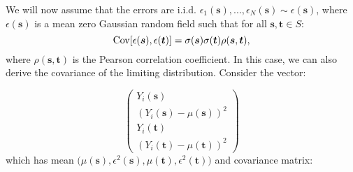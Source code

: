 We will now assume that the errors are i.i.d. $\epsilon_{1}(\bm{s}), ..., \epsilon_{N}(\bm{s}) \sim \epsilon(\bm{s})$, where $\epsilon(\bm{s})$ is a mean zero Gaussian random field such that for all $\bm{s}, \bm{t} \in S$:
\begin{equation}
\label{eq:covariance_of_errors}
\operatorname{\mathrm{Cov}}[\epsilon(\bm{s}),\epsilon(\bm{t})] = \sigma(\bm{s})\sigma(\bm{t})\rho(\bm{s},\bm{t}),
\end{equation}
where $\rho(\bm{s},\bm{t})$ is the Pearson correlation coefficient. In this case, we can also derive the covariance of the limiting distribution. Consider the vector:

\begin{equation}
\label{eq:16}
\begin{pmatrix}
	Y_i(\bm{s}) \\
    (Y_i(\bm{s}) - \mu(\bm{s}))^{2} \\
    Y_i(\bm{t}) \\
    (Y_i(\bm{t}) - \mu(\bm{t}))^{2} 
\end{pmatrix}
\end{equation}
which has mean $\Big(\mu(\bm{s}),\epsilon^{2}(\bm{s}),\mu(\bm{t}),\epsilon^{2}(\bm{t})\Big)$ and covariance matrix:

